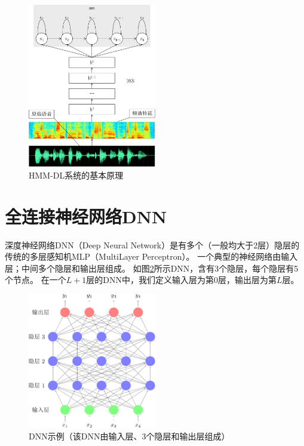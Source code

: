 \begin{figure}[htbp]
\centering
\includegraphics[width=0.5\textwidth]{figures/chapter3/hmmdnn-crop}
\caption{HMM-DL系统的基本原理}
\label{fig:hmmdnn}
\end{figure}


\section{全连接神经网络DNN}

深度神经网络DNN（Deep Neural Network）是有多个（一般均大于2层）隐层的传统的多层感知机MLP（MultiLayer Perceptron）。
一个典型的神经网络由输入层；中间多个隐层和输出层组成。
如图\ref{fig:dnn}所示DNN，含有3个隐层，每个隐层有5个节点。
在一个$L+1$层的DNN中，我们定义输入层为第$0$层，输出层为第$L$层。

\begin{figure}[htbp]
\centering
\includegraphics[width=0.5\textwidth]{figures/chapter3/dnn-crop}
\caption{DNN示例（该DNN由输入层、3个隐层和输出层组成）}
\label{fig:dnn}
\end{figure}

